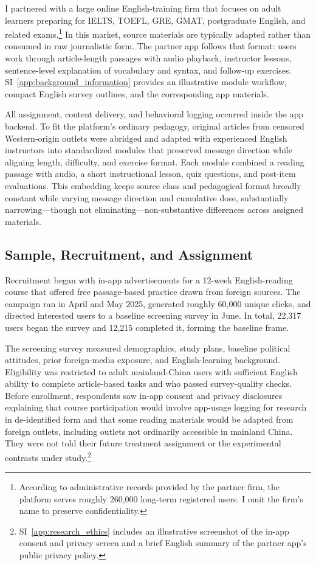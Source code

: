 \documentclass[12pt,american]{article}
\begin{document}
	I partnered with a large online English-training firm that focuses on adult learners preparing for IELTS, TOEFL, GRE, GMAT, postgraduate English, and related exams.\footnote{According to administrative records provided by the partner firm, the platform serves roughly 260,000 long-term registered users. I omit the firm's name to preserve confidentiality.} In this market, source materials are typically adapted rather than consumed in raw journalistic form. The partner app follows that format: users work through article-length passages with audio playback, instructor lessons, sentence-level explanation of vocabulary and syntax, and follow-up exercises. SI~\ref{app:background_information} provides an illustrative module workflow, compact English survey outlines, and the corresponding app materials.
	
	All assignment, content delivery, and behavioral logging occurred inside the app backend. To fit the platform's ordinary pedagogy, original articles from censored Western-origin outlets were abridged and adapted with experienced English instructors into standardized modules that preserved message direction while aligning length, difficulty, and exercise format. Each module combined a reading passage with audio, a short instructional lesson, quiz questions, and post-item evaluations. This embedding keeps source class and pedagogical format broadly constant while varying message direction and cumulative dose, substantially narrowing---though not eliminating---non-substantive differences across assigned materials.
	
	\subsection*{Sample, Recruitment, and Assignment}
	Recruitment began with in-app advertisements for a 12-week English-reading course that offered free passage-based practice drawn from foreign sources. The campaign ran in April and May 2025, generated roughly 60,000 unique clicks, and directed interested users to a baseline screening survey in June. In total, 22,317 users began the survey and 12,215 completed it, forming the baseline frame.
	
The screening survey measured demographics, study plans, baseline political attitudes, prior foreign-media exposure, and English-learning background. Eligibility was restricted to adult mainland-China users with sufficient English ability to complete article-based tasks and who passed survey-quality checks. Before enrollment, respondents saw in-app consent and privacy disclosures explaining that course participation would involve app-usage logging for research in de-identified form and that some reading materials would be adapted from foreign outlets, including outlets not ordinarily accessible in mainland China. They were not told their future treatment assignment or the experimental contrasts under study.\footnote{SI~\ref{app:research_ethics} includes an illustrative screenshot of the in-app consent and privacy screen and a brief English summary of the partner app's public privacy policy.}
	
\end{document}
